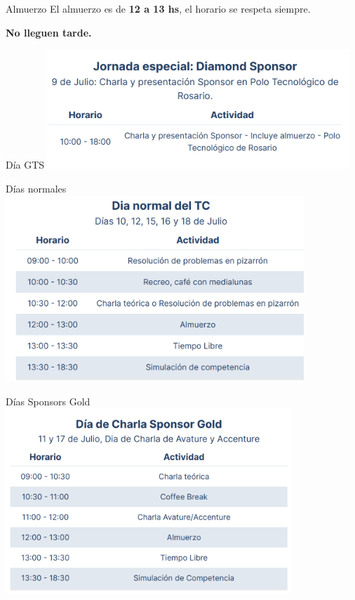 \documentclass{beamer}
\begin{document}
\begin{frame}{Almuerzo}
    \centering
    El almuerzo es de {\bf 12 a 13 hs}, el horario se respeta siempre.
    
    {\bf No lleguen tarde.}
\end{frame}

\begin{frame}{Día GTS}
    \centering
    \includegraphics[clip,height=4.5cm,keepaspectratio]{img/01_gts.png}
\end{frame}

\begin{frame}{Días normales}
    \centering
    \includegraphics[clip,height=7cm,keepaspectratio]{img/02_normal.png}
\end{frame}

\begin{frame}{Días Sponsors Gold}
    \centering
    \includegraphics[clip,height=7cm,keepaspectratio]{img/03_gold.png}
\end{frame}
\end{document}
